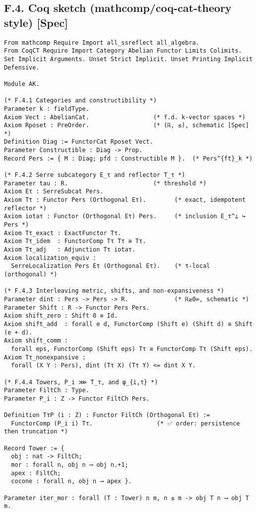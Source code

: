 \documentclass[11pt]{article}
\numberwithin{equation}{section}
\theoremstyle{definition}
\begin{document}
\subsection*{F.4. Coq sketch (\textsf{mathcomp}/\textsf{coq-cat-theory} style) [Spec]}
\begin{verbatim}
From mathcomp Require Import all_ssreflect all_algebra.
From CoqCT Require Import Category Abelian Functor Limits Colimits.
Set Implicit Arguments. Unset Strict Implicit. Unset Printing Implicit Defensive.

Module AK.

(* F.4.1 Categories and constructibility *)
Parameter k : fieldType.
Axiom Vect : AbelianCat.                  (* f.d. k-vector spaces *)
Axiom Rposet : PreOrder.                  (* (ℝ, ≤), schematic [Spec] *)
Definition Diag := FunctorCat Rposet Vect.
Parameter Constructible : Diag -> Prop.
Record Pers := { M : Diag; pfd : Constructible M }.  (* Pers^{ft}_k *)

(* F.4.2 Serre subcategory E_τ and reflector T_τ *)
Parameter tau : R.                        (* threshold *)
Axiom Eτ : SerreSubcat Pers.
Axiom Tτ : Functor Pers (Orthogonal Eτ).        (* exact, idempotent reflector *)
Axiom iotaτ : Functor (Orthogonal Eτ) Pers.     (* inclusion E_τ^⊥ ↪ Pers *)
Axiom Tτ_exact : ExactFunctor Tτ.
Axiom Tτ_idem  : FunctorComp Tτ Tτ ≅ Tτ.
Axiom Tτ_adj   : Adjunction Tτ iotaτ.
Axiom localization_equiv :
  SerreLocalization Pers Eτ (Orthogonal Eτ).    (* τ-local (orthogonal) *)

(* F.4.3 Interleaving metric, shifts, and non-expansiveness *)
Parameter dint : Pers -> Pers -> R.             (* ℝ≥0∞, schematic *)
Parameter Shift : R -> Functor Pers Pers.
Axiom shift_zero : Shift 0 ≅ Id.
Axiom shift_add  : forall e d, FunctorComp (Shift e) (Shift d) ≅ Shift (e + d).
Axiom shift_comm :
  forall eps, FunctorComp (Shift eps) Tτ ≅ FunctorComp Tτ (Shift eps).
Axiom Tτ_nonexpansive :
  forall (X Y : Pers), dint (Tτ X) (Tτ Y) <= dint X Y.

(* F.4.4 Towers, P_i ⋙ T_τ, and φ_{i,τ} *)
Parameter FiltCh : Type.
Parameter P_i : Z -> Functor FiltCh Pers.

Definition TτP (i : Z) : Functor FiltCh (Orthogonal Eτ) :=
  FunctorComp (P_i i) Tτ.                  (* ✅ order: persistence then truncation *)

Record Tower := {
  obj : nat -> FiltCh;
  mor : forall n, obj n ⟶ obj n.+1;
  apex : FiltCh;
  cocone : forall n, obj n ⟶ apex }.

Parameter iter_mor : forall (T : Tower) n m, n ≤ m -> obj T n ⟶ obj T m.


\end{verbatim}
\end{document}

